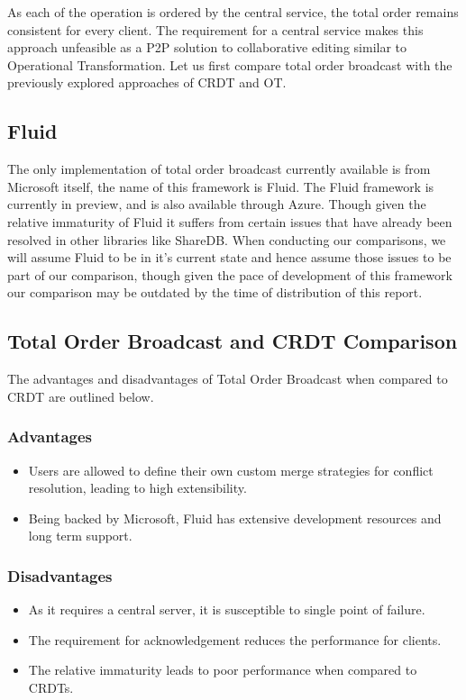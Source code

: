 \documentclass[9pt, titlepage]{article}
\begin{document}
  As each of the operation is ordered by the central service, the total order remains consistent for every client. The requirement for
  a central service makes this approach unfeasible as a P2P solution to collaborative editing similar to Operational Transformation.
  Let us first compare total order broadcast with the previously explored approaches of CRDT and OT.

  \subsection{Fluid}
  The only implementation of total order broadcast currently available is from Microsoft itself, the name of this framework is Fluid.
  The Fluid framework is currently in preview, and is also available through Azure. Though given the relative immaturity of Fluid it 
  suffers from certain issues that have already been resolved in other libraries like ShareDB. When conducting our comparisons, we will
  assume Fluid to be in it's current state and hence assume those issues to be part of our comparison, though given the pace of development
  of this framework our comparison may be outdated by the time of distribution of this report.

  \subsection{Total Order Broadcast and CRDT Comparison}
  The advantages and disadvantages of Total Order Broadcast when compared to CRDT are outlined below.

  \subsubsection{Advantages}
  \begin{itemize}
    \item Users are allowed to define their own custom merge strategies for conflict resolution, leading to high extensibility.
    \item Being backed by Microsoft, Fluid has extensive development resources and long term support.
  \end{itemize}

  \subsubsection{Disadvantages}
  \begin{itemize}
    \item As it requires a central server, it is susceptible to single point of failure.
    \item The requirement for acknowledgement reduces the performance for clients.
    \item The relative immaturity leads to poor performance when compared to CRDTs.
  \end{itemize}
\end{document}
